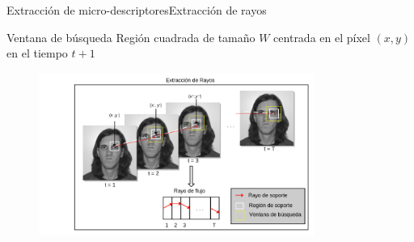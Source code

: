 \documentclass{beamer}
\begin{document}
    
    		\begin{frame}{Extracción de micro-descriptores}{Extracción de rayos}
			\begin{block}{Ventana de búsqueda}
                  Región cuadrada de tamaño $W$ centrada en el píxel $(x,y)$ en el tiempo $t+1$
            \end{block}    			
    			
    			\begin{figure}[bt]
        			\centering
                \includegraphics[width=9cm]{imagenes/Extraccion_de_rayos.png}
            \end{figure}        
	            
        \end{frame}
    
\end{document}
